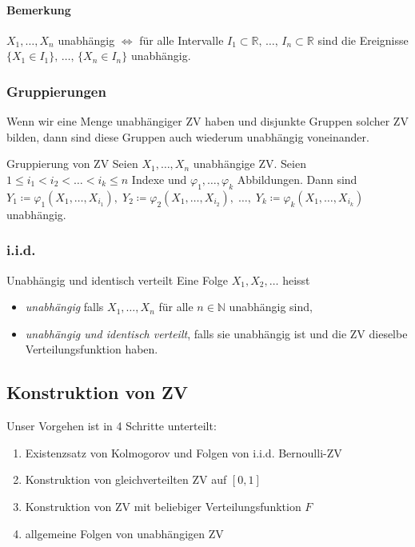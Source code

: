 \documentclass[a4paper,10pt]{article}
\def\N{\mathbb{N}}
\def\R{\mathbb{R}}
\numberwithin{equation}{section}
\begin{document}
\paragraph{Bemerkung} \( X_1, \dots, X_n \) unabhängig \( \iff \) für alle Intervalle \( I_1 \subset \R, \, \dots, \, I_n \subset \R \) sind die Ereignisse \( \{X_1 \in I_1\}, \, \dots, \, \{X_n \in I_n\} \) unabhängig.

\subsubsection{Gruppierungen}

Wenn wir eine Menge unabhängiger ZV haben und disjunkte Gruppen solcher ZV bilden, dann sind diese Gruppen auch wiederum unabhängig voneinander.

\begin{mainbox}{Gruppierung von ZV}
    Seien \( X_1, \dots, X_n \) unabhängige ZV. Seien \( 1 \leq i_1 < i_2 < \dots < i_k \leq n \) Indexe und \( \varphi_1, \dots, \varphi_k \) Abbildungen. Dann sind \( Y_1 \coloneqq \varphi_1(X_1, \dots, X_{i_1}), \; Y_2 \coloneqq \varphi_2(X_1, \dots, X_{i_2}), \; \dots, \; Y_k \coloneqq \varphi_k(X_1, \dots, X_{i_k}) \) unabhängig.
\end{mainbox}

\subsubsection{i.i.d.}

\begin{mainbox}{Unabhängig und identisch verteilt}
    Eine Folge \( X_1, X_2, \dots\) heisst
    \begin{itemize}
        \item \emph{unabhängig} falls \( X_1, \dots, X_n \) für alle \( n \in \N \) unabhängig sind,
        \item \emph{unabhängig und identisch verteilt}, falls sie unabhängig ist und die ZV dieselbe Verteilungsfunktion haben.
    \end{itemize}
\end{mainbox}

\subsection{Konstruktion von ZV}

Unser Vorgehen ist in 4 Schritte unterteilt:
\begin{enumerate}
    \item Existenzsatz von Kolmogorov und Folgen von i.i.d. Bernoulli-ZV
    \item Konstruktion von gleichverteilten ZV auf \( [0, 1] \)
    \item Konstruktion von ZV mit beliebiger Verteilungsfunktion \( F \)
    \item allgemeine Folgen von unabhängigen ZV
\end{enumerate}
\end{document}
